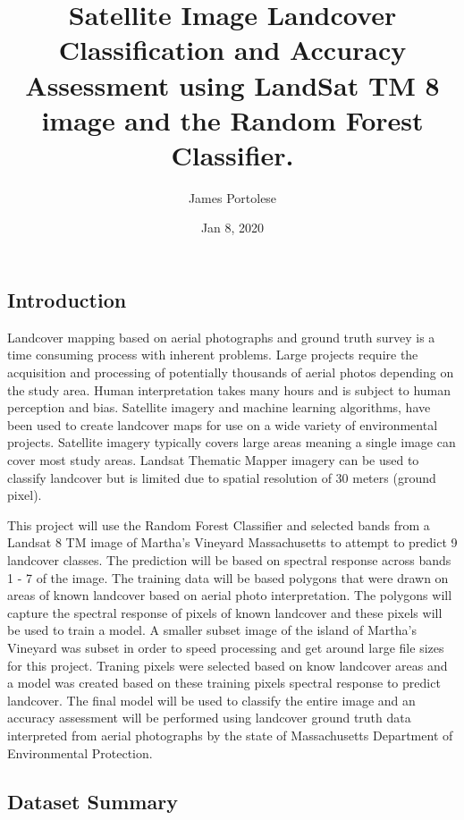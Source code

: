 \documentclass[]{article}
\title{Satellite Image Landcover Classification and Accuracy Assessment using
LandSat TM 8 image and the Random Forest Classifier.}
\author{James Portolese}
\date{Jan 8, 2020}
\begin{document}
\maketitle

\subsection{Introduction}\label{introduction}

Landcover mapping based on aerial photographs and ground truth survey is
a time consuming process with inherent problems. Large projects require
the acquisition and processing of potentially thousands of aerial photos
depending on the study area. Human interpretation takes many hours and
is subject to human perception and bias. Satellite imagery and machine
learning algorithms, have been used to create landcover maps for use on
a wide variety of environmental projects. Satellite imagery typically
covers large areas meaning a single image can cover most study areas.
Landsat Thematic Mapper imagery can be used to classify landcover but is
limited due to spatial resolution of 30 meters (ground pixel).

This project will use the Random Forest Classifier and selected bands
from a Landsat 8 TM image of Martha's Vineyard Massachusetts to attempt
to predict 9 landcover classes. The prediction will be based on spectral
response across bands 1 - 7 of the image. The training data will be
based polygons that were drawn on areas of known landcover based on
aerial photo interpretation. The polygons will capture the spectral
response of pixels of known landcover and these pixels will be used to
train a model. A smaller subset image of the island of Martha's Vineyard
was subset in order to speed processing and get around large file sizes
for this project. Traning pixels were selected based on know landcover
areas and a model was created based on these training pixels spectral
response to predict landcover. The final model will be used to classify
the entire image and an accuracy assessment will be performed using
landcover ground truth data interpreted from aerial photographs by the
state of Massachusetts Department of Environmental Protection.

\subsection{Dataset Summary}\label{dataset-summary}
\end{document}
